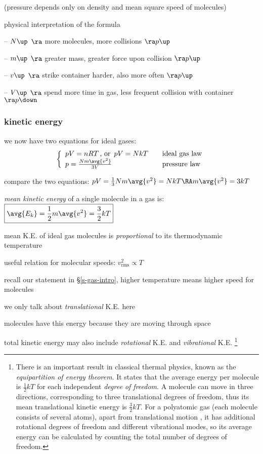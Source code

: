 (pressure depends only on density and mean square speed of molecules)

\cmt physical interpretation of the formula

\begin{compactitem}
\item[--] $N \up$ $\ra$ more molecules, more collisions $\ra p\up$

\item[--] $m \up$ $\ra$ greater mass, greater force upon collision $\ra p\up$

\item[--] $v \up$ $\ra$ strike container harder, also more often $\ra p\up$

\item[--] $V \up$ $\ra$ spend more time in gas, less frequent collision with container $\ra p\down$
\end{compactitem}


\subsubsection{kinetic energy}

we now have two equations for ideal gases:
\begin{equation*}
\left\{
	\begin{array}{ll}
	pV = nRT \, \text{, or } \, pV = NkT &\quad \text{ideal gas law} \\
	p = \frac{Nm\avg{v^2}}{3V} &\quad \text{pressure law}
	\end{array} \right.
\end{equation*}

compare the two equations: $pV=\frac{1}{3}Nm\avg{v^2}=NkT \RA m\avg{v^2}=3kT$

\emph{mean kinetic energy} of a single molecule in a gas is: $\boxed{\avg{E_k}=\frac{1}{2}m\avg{v^2}=\frac{3}{2}kT}$

mean K.E. of ideal gas molecules is \emph{proportional} to its thermodynamic temperature

\cmt useful relation for molecular speeds: $\boxed{v_\text{rms}^2 \propto T}$

recall our statement in \S\ref{s-gas-intro}, higher temperature means higher speed for molecules

\cmt we only talk about \emph{translational} K.E. here

molecules have this energy because they are moving through space

total kinetic energy may also include \emph{rotational} K.E. and \emph{vibrational} K.E.
\footnote{There is an important result in classical thermal physics, known as the \emph{equipartition of energy theorem}. It states that the average energy per molecule is $\frac{1}{2}kT$ for each independent \emph{degree of freedom}. A molecule can move in three directions, corresponding to three translational degrees of freedom, thus its mean translational kinetic energy is $\frac{3}{2}kT$. For a polyatomic gas (each molecule consists of several atoms), apart from translational motion , it has additional rotational degrees of freedom and different vibrational modes, so its average energy can be calculated by counting the total number of degrees of freedom.}

